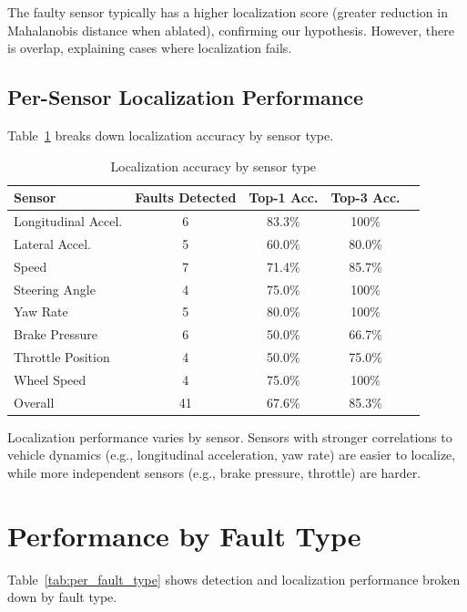 The faulty sensor typically has a higher localization score (greater reduction in Mahalanobis distance when ablated), confirming our hypothesis. However, there is overlap, explaining cases where localization fails.

\subsection{Per-Sensor Localization Performance}

Table~\ref{tab:per_sensor_loc} breaks down localization accuracy by sensor type.

\begin{table}[htbp]
\centering
\caption{Localization accuracy by sensor type}
\label{tab:per_sensor_loc}
\begin{tabular}{@{}lcccc@{}}
\toprule
Sensor & Faults Detected & Top-1 Acc. & Top-3 Acc. \\
\midrule
Longitudinal Accel. & 6 & 83.3\% & 100\% \\
Lateral Accel. & 5 & 60.0\% & 80.0\% \\
Speed & 7 & 71.4\% & 85.7\% \\
Steering Angle & 4 & 75.0\% & 100\% \\
Yaw Rate & 5 & 80.0\% & 100\% \\
Brake Pressure & 6 & 50.0\% & 66.7\% \\
Throttle Position & 4 & 50.0\% & 75.0\% \\
Wheel Speed & 4 & 75.0\% & 100\% \\
\midrule
Overall & 41 & 67.6\% & 85.3\% \\
\bottomrule
\end{tabular}
\end{table}

Localization performance varies by sensor. Sensors with stronger correlations to vehicle dynamics (e.g., longitudinal acceleration, yaw rate) are easier to localize, while more independent sensors (e.g., brake pressure, throttle) are harder.

\section{Performance by Fault Type}

Table~\ref{tab:per_fault_type} shows detection and localization performance broken down by fault type.

